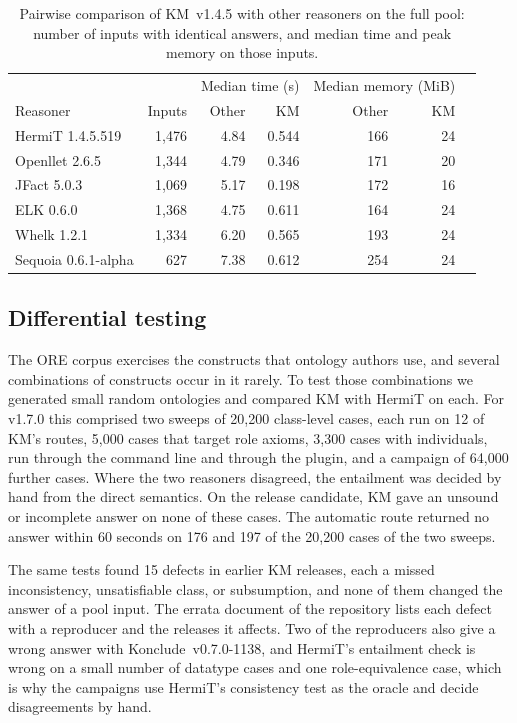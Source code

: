 \begin{table}[t]
\centering
\small
\caption{Pairwise comparison of KM~v1.4.5 with other reasoners on the full
pool: number of inputs with identical answers, and median time and peak memory
on those inputs.}
\label{tab:java}
\begin{tabular}{lrrrrrr}
\toprule
 & & \multicolumn{2}{c}{Median time (s)} & \multicolumn{2}{c}{Median memory (MiB)} \\
Reasoner & Inputs & Other & KM & Other & KM \\
\midrule
HermiT 1.4.5.519 & 1,476 & 4.84 & 0.544 & 166 & 24 \\
Openllet 2.6.5 & 1,344 & 4.79 & 0.346 & 171 & 20 \\
JFact 5.0.3 & 1,069 & 5.17 & 0.198 & 172 & 16 \\
ELK 0.6.0 & 1,368 & 4.75 & 0.611 & 164 & 24 \\
Whelk 1.2.1 & 1,334 & 6.20 & 0.565 & 193 & 24 \\
Sequoia 0.6.1-alpha & 627 & 7.38 & 0.612 & 254 & 24 \\
\bottomrule
\end{tabular}
\end{table}

\subsection{Differential testing}
\label{sec:eval-diff}

The ORE corpus exercises the constructs that ontology authors use, and
several combinations of constructs occur in it rarely.  To test those
combinations we generated small random ontologies and compared KM with HermiT
on each.  For v1.7.0 this comprised two sweeps of 20,200 class-level cases,
each run on 12 of KM's routes, 5,000 cases that target role axioms, 3,300 cases
with individuals, run through the command line and through the plugin, and a
campaign of 64,000 further cases.  Where the two reasoners disagreed, the
entailment was decided by hand from the direct semantics.  On the release
candidate, KM gave an unsound or incomplete answer on none of these cases.
The automatic route returned no answer within 60 seconds on 176 and 197 of the
20,200 cases of the two sweeps.

The same tests found 15 defects in earlier KM releases, each a missed
inconsistency, unsatisfiable class, or subsumption, and none of them changed
the answer of a pool input.  The errata document of the repository lists each
defect with a reproducer and the releases it affects.  Two of the reproducers
also give a wrong answer with Konclude~v0.7.0-1138, and HermiT's entailment
check is wrong on a small number of datatype cases and one role-equivalence
case, which is why the campaigns use HermiT's consistency test as the oracle
and decide disagreements by hand.

